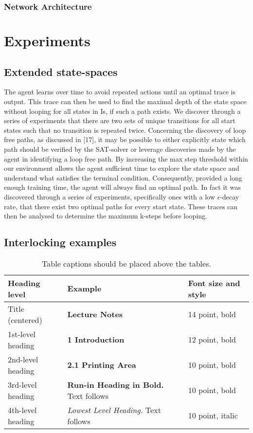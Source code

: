 \documentclass[runningheads]{llncs}
\begin{document}
\subsubsection{Network Architecture}

\section{Experiments}
\subsection{Extended state-spaces}
The agent learns over time to avoid repeated actions until an optimal trace is output.
This trace can then be used to find the maximal depth of the state space without looping
for all states in Is, if such a path exists. We discover through a series of experiments
that there are two sets of unique transitions for all start states such that no transition is
repeated twice. Concerning the discovery of loop free paths, as discussed in [17], it may
be possible to either explicitly state which path should be verified by the SAT-solver or
leverage discoveries made by the agent in identifying a loop free path. By increasing the
max step threshold within our environment allows the agent sufficient time to explore the
state space and understand what satisfies the terminal condition. Consequently, provided
a long enough training time, the agent will always find an optimal path. In fact it was
discovered through a series of experiments, specifically ones with a low $\epsilon$-decay rate, that
there exist two optimal paths for every start state. These traces can then be analysed to
determine the maximum k-steps before looping.
\subsection{Interlocking examples}





\begin{table}
\caption{Table captions should be placed above the
tables.}\label{tab1}
\begin{tabular}{|l|l|l|}
\hline
Heading level &  Example & Font size and style\\
\hline
Title (centered) &  {\Large\bfseries Lecture Notes} & 14 point, bold\\
1st-level heading &  {\large\bfseries 1 Introduction} & 12 point, bold\\
2nd-level heading & {\bfseries 2.1 Printing Area} & 10 point, bold\\
3rd-level heading & {\bfseries Run-in Heading in Bold.} Text follows & 10 point, bold\\
4th-level heading & {\itshape Lowest Level Heading.} Text follows & 10 point, italic\\
\hline
\end{tabular}
\end{table}
\end{document}
